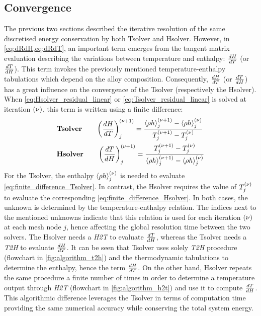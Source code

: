 \subsection{Convergence}
%
The previous two sections described the iterative resolution of the same discretised energy 
conservation by both Tsolver and Hsolver. However, in \cref{eq:dRdH,eq:dRdT}, an important 
term emerges from the tangent matrix evaluation describing the variations between temperature 
and enthalpy: $\frac{dH}{dT}$ (or $\frac{dT}{dH}$). This term invokes the previously mentioned temperature-enthalpy 
tabulations which depend on the alloy composition. Consequently,  $\frac{dH}{dT}$ (or $\frac{dT}{dH}$)
has a great influence on the convergence of the Tsolver (respectively the Hsolver). 
When \cref{eq:Hsolver_residual_linear} or \cref{eq:Tsolver_residual_linear} is solved at iteration ${\left( \nu \right)}$, this term is written using a finite difference:
\begin{align}
\label{eq:finite_difference_Tsolver}
& \textbf{Tsolver} \qquad \left( \frac{dH}{dT} \right)^{{\left( \nu+1 \right)}}_{j} = \frac{\left \langle  \rho h  \right \rangle_j^{{\left( \nu+1 \right)}} - \left \langle  \rho h  \right \rangle_j^{{\left( \nu \right)}}}{T_j^{{\left( \nu+1 \right)}} - T_j^{{\left( \nu \right)}}} \\
\label{eq:finite_difference_Hsolver}
& \textbf{Hsolver} \qquad \left( \frac{dT}{dH} \right)^{{\left( \nu+1 \right)}}_{j} = \frac{T_j^{{\left( \nu+1 \right)}} - T_j^{{\left( \nu \right)}}}{\left \langle  \rho h  \right \rangle_j^{{\left( \nu+1 \right)}} - \left \langle  \rho h  \right \rangle_j^{{\left( \nu \right)}}}
\end{align}
For the Tsolver, the enthalpy $\left \langle  \rho h  \right \rangle_j^{{\left( \nu \right)}}$ is needed to evaluate \cref{eq:finite_difference_Tsolver}. 
In contrast, the Hsolver requires the value of $T_j^{{\left( \nu \right)}}$ to evaluate the corresponding \cref{eq:finite_difference_Hsolver}.
In both cases, the unknown is determined by the temperature-enthalpy relation. The indices next to the mentioned unknowns
indicate that this relation is used for each iteration ${\left( \nu \right)}$ at each mesh node $j$, hence affecting the global resolution time 
between the two solvers. The Hsolver needs a \emph{H2T} to evaluate $\frac{dT}{dH}$, whereas the Tsolver needs a \emph{T2H} to evaluate $\frac{dH}{dT}$.
It can be seen that Tsolver uses solely \emph{T2H} procedure (flowchart in \cref{fig:algorithm_t2h}) and the thermodynamic tabulations to determine the enthalpy, 
hence the term $\frac{dH}{dT}$. On the other hand, Hsolver repeats the same procedure a finite number of times in order to 
determine a temperature output through \emph{H2T} (flowchart in \cref{fig:algorithm_h2t}) and use it to compute $\frac{dT}{dH}$. This algorithmic difference leverages the 
Tsolver in terms of computation time providing the same numerical accuracy while conserving the total system energy. 

